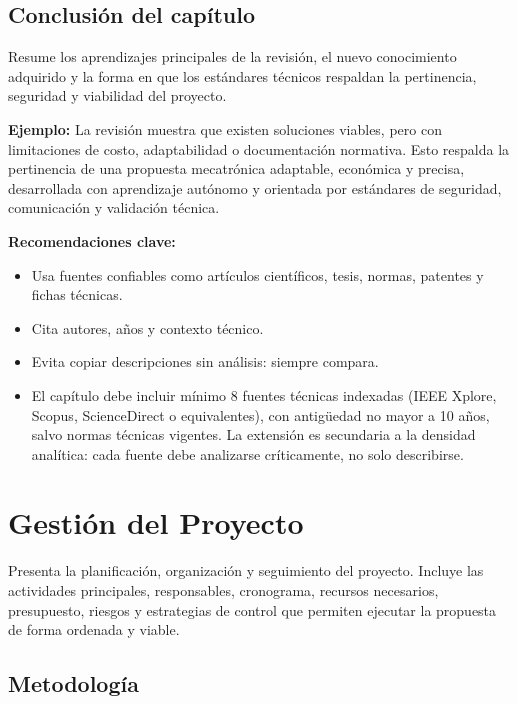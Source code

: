 \documentclass[12pt,letterpaper]{report}
\begin{document}
\section{Conclusión del capítulo}
\begin{instrucciones}
Resume los aprendizajes principales de la revisión, el nuevo conocimiento adquirido y la forma en que los estándares técnicos respaldan la pertinencia, seguridad y viabilidad del proyecto.

\vspace{2mm}
\noindent \textbf{Ejemplo:} La revisión muestra que existen soluciones viables, pero con limitaciones de costo, adaptabilidad o documentación normativa. Esto respalda la pertinencia de una propuesta mecatrónica adaptable, económica y precisa, desarrollada con aprendizaje autónomo y orientada por estándares de seguridad, comunicación y validación técnica.

\vspace{2mm}
\noindent \textbf{Recomendaciones clave:}
\begin{itemize}
  \item Usa fuentes confiables como artículos científicos, tesis, normas, patentes y fichas técnicas.
  \item Cita autores, años y contexto técnico.
  \item Evita copiar descripciones sin análisis: siempre compara.
  \item El capítulo debe incluir mínimo 8 fuentes técnicas indexadas (IEEE Xplore, Scopus, ScienceDirect o equivalentes), con antigüedad no mayor a 10 años, salvo normas técnicas vigentes. La extensión es secundaria a la densidad analítica: cada fuente debe analizarse críticamente, no solo describirse.
\end{itemize}
\end{instrucciones}

\chapter{Gestión del Proyecto}

\begin{instrucciones}
Presenta la planificación, organización y seguimiento del proyecto. Incluye las actividades principales, responsables, cronograma, recursos necesarios, presupuesto, riesgos y estrategias de control que permiten ejecutar la propuesta de forma ordenada y viable.
\end{instrucciones}

\section{Metodología}
\end{document}
